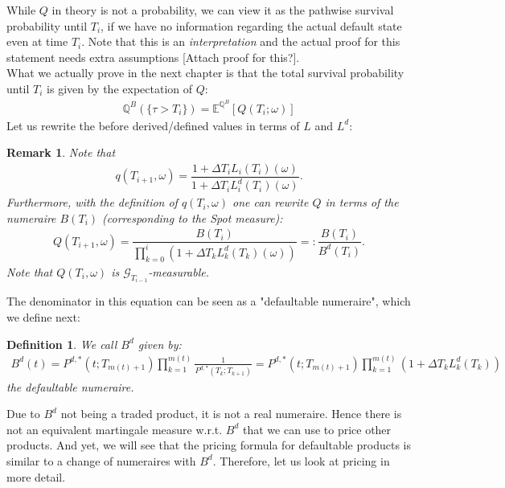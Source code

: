 \documentclass[12pt]{article}
\newtheorem{remark}[theorem]{Remark}
\newtheorem{definition}[theorem]{Definition}
\begin{document}
	While $Q$ in theory is not a probability, we can view it as the pathwise survival probability until $T_i$, if we have no information regarding the actual default state even at time $T_i$. Note that this is an \emph{interpretation} and the actual proof for this statement needs extra assumptions \color{red}[Attach proof for this?]\color{black}.\\
	What we actually prove in the next chapter is that the total survival probability until $T_i$ is given by the expectation of $Q$:
	\begin{align*}
		\mathbb{Q}^B\left(\{\tau > T_i\}\right) = \mathbb{E}^{\mathbb{Q}^B} \left[Q(T_i;\omega)\right]
	\end{align*}
	Let us rewrite the before derived/defined values in terms of $L$ and $L^d$:
	\begin{remark}
		Note that 
		\begin{align*}
			q(T_{i+1}, \omega) = \dfrac{1 + \Delta  T_i L_i(T_i)(\omega)}{1 + \Delta  T_i L^d_i(T_i)(\omega)}.
		\end{align*}
		Furthermore, with the definition of $q(T_i, \omega)$ one can rewrite $Q$ in terms of the numeraire $B(T_i)$ (corresponding to the Spot measure):
		\begin{align*}
			Q\left( T_{i+1}, \omega \right) = \dfrac{B(T_i)}{\prod_{k=0}^{i}(1 + \Delta T_k L^d_k(T_k)(\omega))} =: \dfrac{B(T_i)}{B^d(T_i)}.
		\end{align*}
		Note that $Q(T_i, \omega)$ is $\mathcal{G}_{T_{i-1}}$-measurable.
	\end{remark}
	The denominator in this equation can be seen as a "defaultable numeraire", which we define next:
	\begin{definition}
		We call $B^d$ given by:
		\begin{align*}
			B^d(t) = P^{d,*}(t;T_{m(t)+1}) \prod_{k=1}^{m(t)}\frac{1}{P^{d,*}(T_k;T_{k+1})} = P^{d,*}(t;T_{m(t)+1}) \prod_{k=1}^{m(t)}(1+\Delta T_k L^d_k(T_k))
		\end{align*}
		the \emph{defaultable numeraire}. 
	\end{definition}
	Due to $B^d$ not being a traded product, it is not a real numeraire. Hence there is not an equivalent martingale measure w.r.t. $B^d$ that we can use to price other products. And yet, we will see that the pricing formula for defaultable products is similar to a change of numeraires with $B^d$. Therefore, let us look at pricing in more detail.
	
	
	
	
\end{document}
